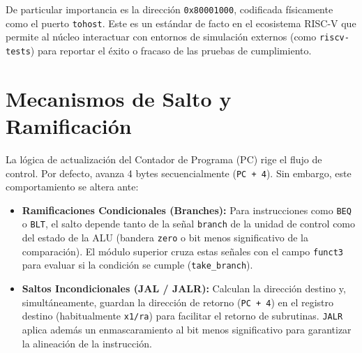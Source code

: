 De particular importancia es la dirección \texttt{0x80001000}, codificada físicamente como el puerto \texttt{tohost}. Este es un estándar de facto en el ecosistema RISC-V que permite al núcleo interactuar con entornos de simulación externos (como \texttt{riscv-tests}) para reportar el éxito o fracaso de las pruebas de cumplimiento.

\section{Mecanismos de Salto y Ramificación}
\label{sec:BranchJump}

La lógica de actualización del Contador de Programa (PC) rige el flujo de control. Por defecto, avanza 4 bytes secuencialmente (\texttt{PC + 4}). Sin embargo, este comportamiento se altera ante:
\begin{itemize}
    \item \textbf{Ramificaciones Condicionales (Branches):} Para instrucciones como \texttt{BEQ} o \texttt{BLT}, el salto depende tanto de la señal \texttt{branch} de la unidad de control como del estado de la ALU (bandera \texttt{zero} o bit menos significativo de la comparación). El módulo superior cruza estas señales con el campo \texttt{funct3} para evaluar si la condición se cumple (\texttt{take\_branch}).
    \item \textbf{Saltos Incondicionales (JAL / JALR):} Calculan la dirección destino y, simultáneamente, guardan la dirección de retorno (\texttt{PC + 4}) en el registro destino (habitualmente \texttt{x1/ra}) para facilitar el retorno de subrutinas. \texttt{JALR} aplica además un enmascaramiento al bit menos significativo para garantizar la alineación de la instrucción.
\end{itemize}

\chapterend{}
